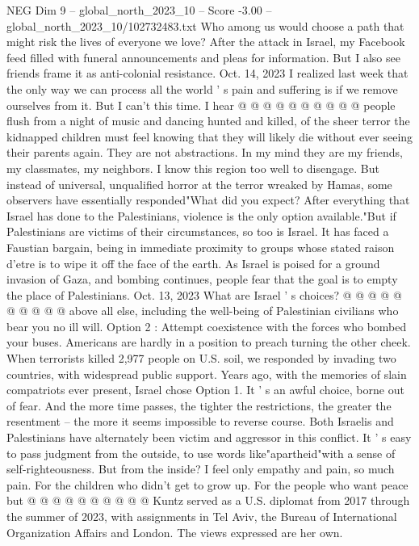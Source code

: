 \begin{textsample}{NEG Dim 9 – global\_north\_2023\_10 – Score -3.00 – global\_north\_2023\_10/102732483.txt}
Who among us would choose a path that might risk the lives of everyone we love?
After the attack in Israel, my Facebook feed filled with funeral announcements and pleas for information.
But I also see friends frame it as anti-colonial resistance.
Oct. 14, 2023 I realized last week that the only way we can process all the world ' s pain and suffering is if we remove ourselves from it.
But I can't this time.
I hear @ @ @ @ @ @ @ @ @ @ people flush from a night of music and dancing hunted and killed, of the sheer terror the kidnapped children must feel knowing that they will likely die without ever seeing their parents again.
They are not abstractions.
In my mind they are my friends, my classmates, my neighbors.
I know this region too well to disengage.
But instead of universal, unqualified horror at the terror wreaked by Hamas, some observers have essentially responded"What did you expect?
After everything that Israel has done to the Palestinians, violence is the only option available."But if Palestinians are victims of their circumstances, so too is Israel.
It has faced a Faustian bargain, being in immediate proximity to groups whose stated raison d'etre is to wipe it off the face of the earth.
As Israel is poised for a ground invasion of Gaza, and bombing continues, people fear that the goal is to empty the place of Palestinians.
Oct. 13, 2023 What are Israel ' s choices? @ @ @ @ @ @ @ @ @ @ above all else, including the well-being of Palestinian civilians who bear you no ill will.
Option 2 : Attempt coexistence with the forces who bombed your buses.
Americans are hardly in a position to preach turning the other cheek.
When terrorists killed 2,977 people on U.S. soil, we responded by invading two countries, with widespread public support.
Years ago, with the memories of slain compatriots ever present, Israel chose Option 1.
It ' s an awful choice, borne out of fear.
And the more time passes, the tighter the restrictions, the greater the resentment -- the more it seems impossible to reverse course.
Both Israelis and Palestinians have alternately been victim and aggressor in this conflict.
It ' s easy to pass judgment from the outside, to use words like"apartheid"with a sense of self-righteousness.
But from the inside?
I feel only empathy and pain, so much pain.
For the children who didn't get to grow up.
For the people who want peace but @ @ @ @ @ @ @ @ @ @ Kuntz served as a U.S. diplomat from 2017 through the summer of 2023, with assignments in Tel Aviv, the Bureau of International Organization Affairs and London.
The views expressed are her own.

\end{textsample}
